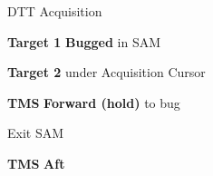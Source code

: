 \begin{tcoloritemize}
{    DTT Acquisition

    \begin{subenumerate}
        \item \textbf{Target 1} \dotfill \textbf{Bugged} in SAM
        \item \textbf{Target 2} \dotfill under Acquisition Cursor
        \item \textbf{TMS} \dotfill \textbf{Forward (hold)} to bug
    \end{subenumerate}
    
    Exit SAM 
    
    \begin{subenumerate}
        \item \textbf{TMS} \dotfill \textbf{Aft}
    \end{subenumerate}}
\end{tcoloritemize}




\clearpage

